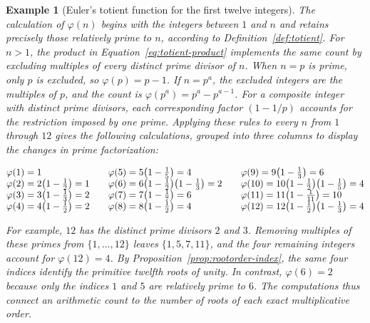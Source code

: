 \documentclass[11pt,a4paper]{article}
\numberwithin{equation}{section}
\theoremstyle{uprightpaper}
\newtheorem{example}{Example}[section]
\begin{document}
\begin{example}[Euler's totient function for the first twelve integers]\label{ex:totients-twelve}
The calculation of $\varphi(n)$ begins with the integers between $1$ and
$n$ and retains precisely those relatively prime to $n$, according to
Definition~\ref{def:totient}. For $n>1$, the product in
Equation~\eqref{eq:totient-product} implements the same count by excluding
multiples of every distinct prime divisor of $n$. When $n=p$ is prime,
only $p$ is excluded, so $\varphi(p)=p-1$. If $n=p^a$, the excluded
integers are the multiples of $p$, and the count is
$\varphi(p^a)=p^a-p^{a-1}$. For a composite integer with distinct prime
divisors, each corresponding factor $(1-1/p)$ accounts for the
restriction imposed by one prime. Applying these rules to every
$n$ from $1$ through $12$ gives the following calculations, grouped
into three columns to display the changes in prime factorization:
\begin{center}
\begingroup
\footnotesize
\renewcommand{\arraystretch}{1.65}
\setlength{\arraycolsep}{0pt}
\(\begin{array}{@{}l@{\qquad}l@{\qquad}l@{}}
 \varphi(1)=1
 &\varphi(5)=5\bigl(1-\frac15\bigr)=4
 &\varphi(9)=9\bigl(1-\frac13\bigr)=6\\
 \varphi(2)=2\bigl(1-\frac12\bigr)=1
 &\varphi(6)=6\bigl(1-\frac12\bigr)\bigl(1-\frac13\bigr)=2
 &\varphi(10)=10\bigl(1-\frac12\bigr)\bigl(1-\frac15\bigr)=4\\
 \varphi(3)=3\bigl(1-\frac13\bigr)=2
 &\varphi(7)=7\bigl(1-\frac17\bigr)=6
 &\varphi(11)=11\bigl(1-\frac1{11}\bigr)=10\\
 \varphi(4)=4\bigl(1-\frac12\bigr)=2
 &\varphi(8)=8\bigl(1-\frac12\bigr)=4
 &\varphi(12)=12\bigl(1-\frac12\bigr)\bigl(1-\frac13\bigr)=4
\end{array}\)
\endgroup
\end{center}
For example, $12$ has the distinct prime divisors $2$ and $3$.
Removing multiples of these primes from $\{1,\ldots,12\}$ leaves
$\{1,5,7,11\}$, and the four remaining integers account for
$\varphi(12)=4$. By Proposition~\ref{prop:rootorder-index}, the same
four indices identify the primitive twelfth roots of unity. In contrast,
$\varphi(6)=2$ because only the indices $1$ and $5$ are relatively
prime to $6$. The computations thus connect an arithmetic count to the
number of roots of each exact multiplicative order.
\end{example}
\end{document}
